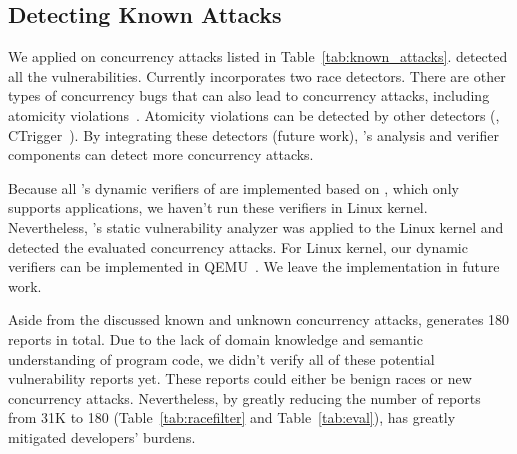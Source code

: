\subsection{Detecting Known Attacks}\label{sec:known-attacks}

We applied \xxx on \nknownVul concurrency attacks listed in 
Table~\ref{tab:known_attacks}. \xxx detected all the vulnerabilities.
Currently \xxx incorporates two race detectors. There are other
types of concurrency bugs that can also lead to concurrency attacks, including
atomicity violations~\cite{lu:concurrency-bugs}. Atomicity violations 
can be detected by other detectors (\eg, CTrigger~\cite{ctrigger:asplos09}). By 
integrating these detectors (future work), \xxx's analysis and verifier 
components can detect more concurrency attacks.




Because all \xxx's dynamic verifiers of are implemented based on \lldb, which 
only supports applications, we haven't run these verifiers in Linux kernel. 
Nevertheless, \xxx's static vulnerability analyzer was applied to the Linux 
kernel and detected the evaluated concurrency attacks. For Linux kernel, our 
dynamic verifiers can be implemented in QEMU~\cite{qemu}. We leave the 
implementation in future work.
 
Aside from the discussed known and unknown concurrency attacks, \xxx generates 
180 reports in total. Due to the lack of domain knowledge and semantic 
understanding of program code, we didn't verify all of these 
potential vulnerability reports yet. These reports could either be benign 
races or new concurrency attacks. Nevertheless, by 
greatly reducing the number of reports from 31K to 
180 (Table~\ref{tab:racefilter} and Table~\ref{tab:eval}),
\xxx has greatly mitigated developers' burdens.

